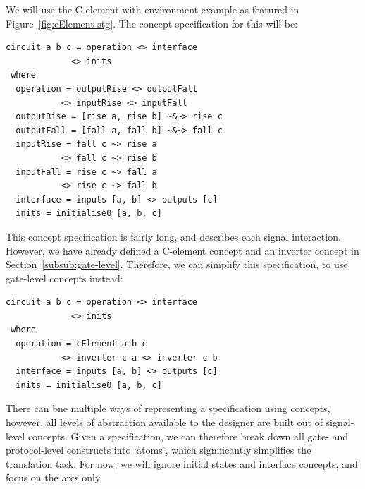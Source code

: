 \documentclass[british,conference,compsoc]{IEEEtran}
\begin{document}
We will use the C-element with environment example as featured in Figure~\ref{fig:cElement-stg}.
The concept specification for this will be:

\begin{verbatim}
circuit a b c = operation <> interface 
             <> inits
 where
  operation = outputRise <> outputFall 
           <> inputRise <> inputFall
  outputRise = [rise a, rise b] ~&~> rise c
  outputFall = [fall a, fall b] ~&~> fall c
  inputRise = fall c ~> rise a 
           <> fall c ~> rise b
  inputFall = rise c ~> fall a 
           <> rise c ~> fall b
  interface = inputs [a, b] <> outputs [c]
  inits = initialise0 [a, b, c]
\end{verbatim}

This concept specification is fairly long, and describes each signal interaction.
However, we have already defined a C-element concept and an inverter concept
 in Section~\ref{subsub:gate-level}. Therefore, we can simplify this specification, 
 to use gate-level concepts instead:
 \vspace{5mm}
 
\begin{verbatim}
circuit a b c = operation <> interface 
             <> inits
 where
  operation = cElement a b c 
           <> inverter c a <> inverter c b
  interface = inputs [a, b] <> outputs [c]
  inits = initialise0 [a, b, c]
\end{verbatim}

There can bne multiple ways of representing a specification using concepts, however,
all levels of abstraction available to the designer are built out of signal-level
concepts. Given a specification, we can therefore break down 
all gate- and protocol-level constructs into `atoms', which significantly 
simplifies the translation task. For now, we will ignore initial states and interface
concepts, and focus on the arcs only.
\end{document}
